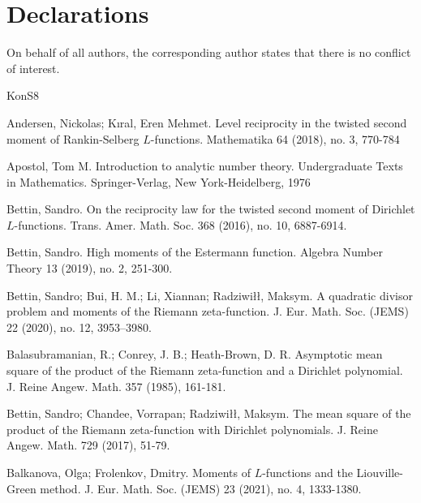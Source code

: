 \documentclass[11pt,reqno]{amsart}
\theoremstyle{definition}
\theoremstyle{definition}
\theoremstyle{remark}
\numberwithin{equation}{section}
\begin{document}
\section{Declarations}
On behalf of all authors, the corresponding author states that there is no conflict of interest.




\begin{thebibliography}{KonS8}
	
	Andersen, Nickolas; Kıral, Eren Mehmet.  Level reciprocity in the twisted second moment of Rankin-Selberg $L$-functions. Mathematika 64 (2018), no. 3, 770-784
	
	Apostol, Tom M. Introduction to analytic number theory. Undergraduate Texts in Mathematics. Springer-Verlag, New York-Heidelberg, 1976
	

	  
	  Bettin, Sandro. On the reciprocity law for the twisted second moment of Dirichlet $L$-functions. Trans. Amer. Math. Soc. 368 (2016), no. 10, 6887-6914.
	  
	  Bettin, Sandro. High moments of the Estermann function. Algebra Number Theory 13 (2019), no. 2, 251-300.
	  
	
	 
	 Bettin, Sandro; Bui, H. M.; Li, Xiannan; Radziwiłł, Maksym. A quadratic divisor problem and moments of the Riemann zeta-function. J. Eur. Math. Soc. (JEMS) 22 (2020), no. 12, 3953–3980. 
	 
	 Balasubramanian, R.; Conrey, J. B.; Heath-Brown, D. R. Asymptotic mean square of the product of the Riemann zeta-function and a Dirichlet polynomial. J. Reine Angew. Math. 357 (1985), 161-181.
	 
	 Bettin, Sandro; Chandee, Vorrapan; Radziwiłł, Maksym. The mean square of the product of the Riemann zeta-function with Dirichlet polynomials. J. Reine Angew. Math. 729 (2017), 51-79.
	 
	
	 

	  Balkanova, Olga; Frolenkov, Dmitry. Moments of $L$-functions and the Liouville-Green method. J. Eur. Math. Soc. (JEMS) 23 (2021), no. 4, 1333-1380. 

	

	

	 	 
	 	 

\end{thebibliography}
\end{document}
